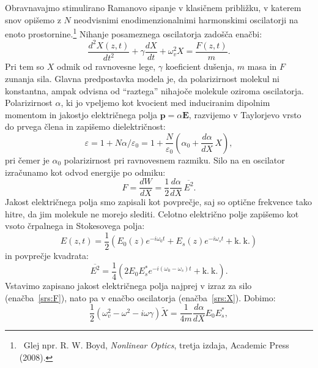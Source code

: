Obravnavajmo stimulirano Ramanovo sipanje v klasičnem približku, v katerem snov opišemo 
z $N$ neodvisnimi enodimenzionalnimi harmonskimi oscilatorji na enoto prostornine.\footnote{~Glej npr. 
R. W. Boyd, {\it Nonlinear Optics}, tretja izdaja, Academic Press (2008).} Nihanje
posameznega oscilatorja zadošča enačbi:
\begin{equation}
\frac{d^2X(z,t)}{dt^2}+ \gamma \frac{dX}{dt}+\omega_v^2X = \frac{F(z,t)}{m}.
\label{srs:X}
\end{equation}
Pri tem so $X$ odmik od ravnovesne lege, $\gamma$ koeficient dušenja, $m$ masa in $F$ zunanja sila.
Glavna predpostavka modela je, da polarizirnost molekul ni konstantna, ampak odvisna od 
``raztega'' nihajoče molekule oziroma oscilatorja. Polarizirnost $\alpha$, ki jo vpeljemo
kot kvocient med induciranim dipolnim momentom in jakostjo električnega polja $\mathbf{p} = \alpha \mathbf{E}$,
razvijemo v Taylorjevo vrsto do prvega člena in zapišemo dielektričnost:
\begin{equation}
\varepsilon = 1+N\alpha/\varepsilon_0 = 1+\frac{N}{\varepsilon_0}\left(\alpha_0 + \frac{d\alpha}{dX}\,X\right)\!\!,
\label{srs:a}
\end{equation}
pri čemer je $\alpha_0$ polarizirnost pri ravnovesnem razmiku.
Silo na en oscilator izračunamo kot odvod energije po odmiku:
\begin{equation}
F = \frac{dW}{dX}= \frac{1}{2}\frac{d\alpha}{dX}\,\overline{E^2}.
\label{srs:F}
\end{equation}
Jakost električnega polja smo zapisali kot povprečje, saj so optične frekvence 
tako hitre, da jim molekule ne morejo slediti. 
Celotno električno polje zapišemo kot vsoto črpalnega in Stokesovega polja:
\begin{equation}
E(z,t)= \frac{1}{2}\left( E_0(z)e^{-i\omega_0t}+ E_s(z)e^{-i\omega_st} + \mathrm{k.~k.}\right)
\label{eq:srsE}
\end{equation}
in povprečje kvadrata:
\begin{equation}
\overline{E^2} = \frac{1}{4}\left(2E_0E_s^* e^{-i(\omega_0-\omega_s)t}+\mathrm{k.~k.}\right)\!\!.
\end{equation}
Vstavimo zapisano jakost električnega polja najprej v izraz za silo (enačba~\ref{srs:F}),
nato pa v enačbo oscilatorja (enačba~\ref{srs:X}). Dobimo:
\begin{equation}
\frac{1}{2}\left(\omega_v^2-\omega^2-i\omega\gamma\right)\tilde{X} = 
\frac{1}{4m}\frac{d\alpha}{dX}E_0 E_s^*,
\end{equation}
